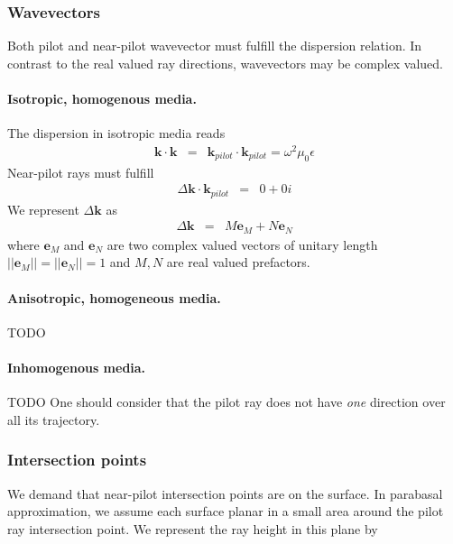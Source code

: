 \documentclass[12pt,a4paper,twoside,openright,BCOR10mm,headsepline,titlepage,abstracton,chapterprefix,final]{scrreprt}
\newcommand\Vector[1]{{\mathbf{#1}}}
\newcommand\vacuum{0}
\newcommand\wavenumber{k}
\newcommand\Wavevector{\Vector{\wavenumber}}
\newcommand\vacuumpermeability{\mu_{\vacuum}}
\newcommand\scalarpermittivity{\epsilon}
\begin{document}
\subsubsection{Wavevectors}
Both pilot and near-pilot wavevector must fulfill the dispersion relation. 
In contrast to the real valued ray directions, wavevectors may be complex valued.

\paragraph{Isotropic, homogenous media.}

The dispersion in isotropic media reads
\begin{eqnarray}
 \Wavevector \cdot \Wavevector &=& \Wavevector_{pilot} \cdot \Wavevector_{pilot} = \omega^2 \vacuumpermeability \scalarpermittivity
\end{eqnarray}
Near-pilot rays must fulfill
\begin{eqnarray}
 \Delta \Wavevector \cdot \Wavevector_{pilot} &=& 0 + 0i
\end{eqnarray}
We represent $\Delta \Wavevector$ as
\begin{eqnarray}
 \Delta \Wavevector &=& M \Vector{e}_M + N \Vector{e}_N
\end{eqnarray}
where $\Vector{e}_M$ and $\Vector{e}_N$ are two complex valued vectors of unitary length
$||\Vector{e}_M||=||\Vector{e}_N||=1$ and $M,N$ are real valued prefactors.

\paragraph{Anisotropic, homogeneous media.}
TODO

\paragraph{Inhomogenous media.}
TODO
One should consider that the pilot ray does not have \emph{one} direction over all its trajectory.

\subsubsection{Intersection points}

We demand that near-pilot intersection points are on the surface.
In parabasal approximation, we assume each surface planar in a small area around the pilot ray intersection point. 
We represent the ray height in this plane by
\end{document}
